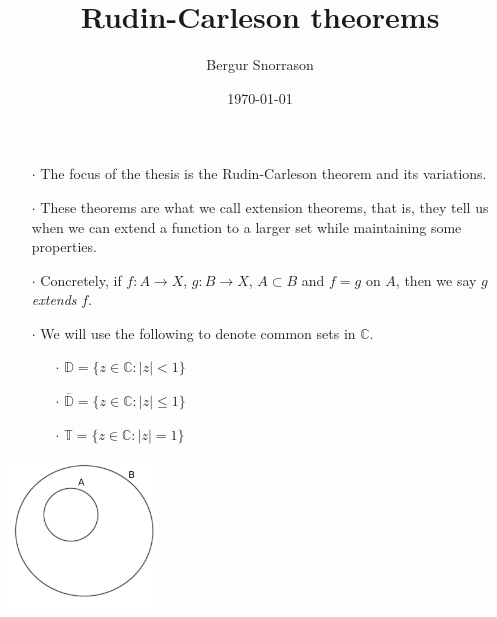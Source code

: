 \documentclass{beamer}
\title{Rudin-Carleson theorems}
\author{Bergur Snorrason}
\date{\today}
\begin{document}
\frame{\titlepage}

\begin{frame}
\begin{enumerate}
\item[$\cdot$] The focus of the thesis is the Rudin-Carleson theorem and its variations.
\item[$\cdot$] These theorems are what we call extension theorems, that is, they tell us when we can extend a function to a larger set while maintaining some properties.
\item[$\cdot$] Concretely, if $f \colon A \rightarrow X$, $g \colon B \rightarrow X$, $A \subset B$ and $f = g$ on $A$, then we say $g$ \emph{extends} $f$.
\end{enumerate}
\begin{multicols}{2}
\begin{enumerate}
\item[$\cdot$] We will use the following to denote common sets in $\mathbb{C}$.
\begin{enumerate}
\item[$\cdot$] $\mathbb{D} = \{z \in \mathbb{C} \colon |z| < 1\}$
\item[$\cdot$] $\overline{\mathbb{D}} = \{z \in \mathbb{C} \colon |z| \leq 1\}$
\item[$\cdot$] $\mathbb{T} = \{z \in \mathbb{C} \colon |z| = 1\}$
\end{enumerate}
\end{enumerate}
\includegraphics[width=0.3\textwidth]{extend}
\end{multicols}
\end{frame}
\end{document}
